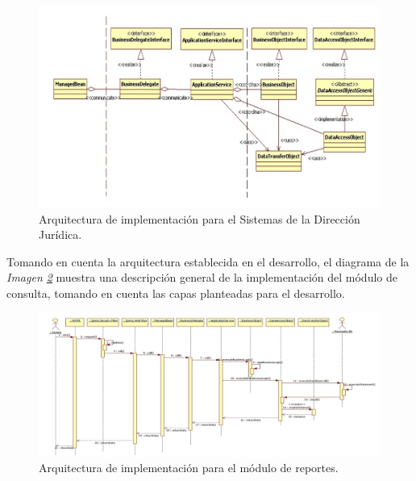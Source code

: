 \documentclass[../reportesINE.tex]{subfiles}
\begin{document}
\begin{figure}[h]
  \centering
  \includegraphics[width=\linewidth]{img/asoftgeneral.png}
  \caption{Arquitectura de implementación para el Sistemas de la Dirección Jurídica.}
  \label{fig:asoftgeneral}
\end{figure}

Tomando en cuenta la arquitectura establecida en el desarrollo,  el diagrama de la \textit{Imagen \ref{fig:asoftmodulo}}  muestra una descripción general de la implementación del módulo de consulta, tomando en cuenta las capas planteadas para el desarrollo.

\begin{figure}[h]
  \centering
  \includegraphics[width=\linewidth]{img/asoftmodulo.png}
  \caption{Arquitectura de implementación para el módulo de reportes.}
  \label{fig:asoftmodulo}
\end{figure}
\end{document}
